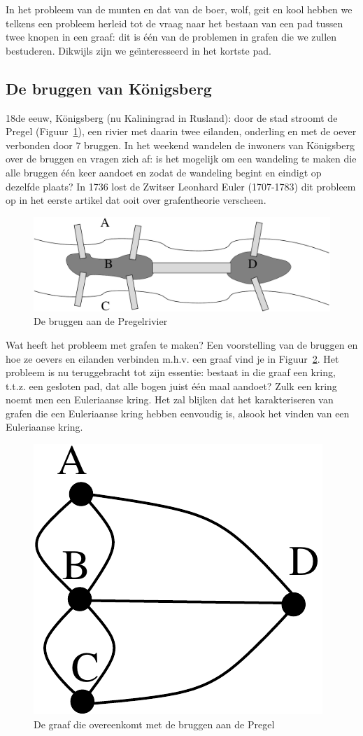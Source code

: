 In het probleem van de munten en dat van de boer, wolf, geit en kool
hebben we telkens een probleem herleid tot de vraag naar het bestaan
van een pad tussen twee knopen in een graaf: dit is \'{e}\'{e}n van de
problemen in grafen die we zullen bestuderen. Dikwijls zijn we
ge\"{\i}nteresseerd in het kortste pad.

\subsection{De bruggen van K\"onigsberg}

18de eeuw, K\"onigsberg (nu Kaliningrad in Rusland): door de stad
stroomt de Pregel (Figuur~\ref{pregel}), een rivier met daarin twee
eilanden, onderling en met de oever verbonden door 7 bruggen. In het
weekend wandelen de inwoners van K\"onigsberg over de bruggen en vragen
zich af: is het mogelijk om een wandeling te maken die alle bruggen
\'{e}\'{e}n keer aandoet en zodat de wandeling begint en eindigt op
dezelfde plaats? In 1736 lost de Zwitser Leonhard Euler (1707-1783)
dit probleem op in het eerste artikel dat ooit over grafentheorie
verscheen.

\begin{figure}[ht]
\begin{center}
\includegraphics[width=0.4\linewidth,keepaspectratio]{pregel}
\end{center}
\caption{De bruggen aan de Pregelrivier \label{pregel}}
\end{figure}

Wat heeft het probleem met grafen te maken? Een voorstelling van de
bruggen en hoe ze oevers en eilanden verbinden m.h.v. een graaf vind
je in Figuur~\ref{pregelgraph}. Het probleem is nu teruggebracht tot
zijn essentie: bestaat in die graaf een kring, t.t.z. een gesloten
pad, dat alle bogen juist \'{e}\'{e}n maal aandoet? Zulk een kring
noemt men een Euleriaanse kring. Het zal blijken dat het
karakteriseren van grafen die een Euleriaanse kring hebben eenvoudig
is, alsook het vinden van een Euleriaanse kring.

\begin{figure}[ht]
\begin{center}
\includegraphics[width=0.15\linewidth,keepaspectratio]{pregelgraph}
\end{center}
\caption{De graaf die overeenkomt met de bruggen aan de Pregel
\label{pregelgraph}}
\end{figure}

